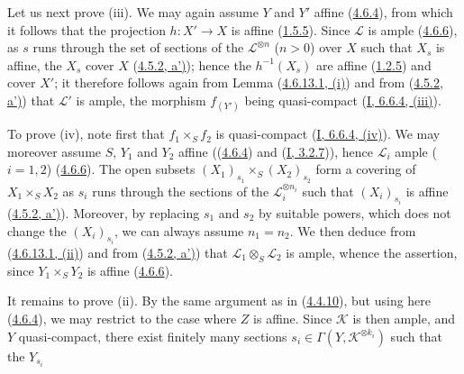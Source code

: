 Let us next prove (iii). We may again assume $Y$ and $Y'$ affine
(\hyperref[II.4.6.4]{4.6.4}), from which it follows that the projection
$h:X'\to X$ is affine (\hyperref[II.1.5.5]{1.5.5}). Since
$\mathcal{L}$ is ample (\hyperref[II.4.6.6]{4.6.6}), as $s$
runs through the set of sections of the $\mathcal{L}^{\otimes n}$ ($n>0$)
over $X$ such that $X_s$ is affine, the $X_s$ cover $X$
(\hyperref[II.4.5.2]{4.5.2, a')}); hence the $h^{-1}(X_s)$ are affine
(\hyperref[II.1.2.5]{1.2.5}) and cover $X'$; it therefore follows again
from Lemma (\hyperref[II.4.6.13.1]{4.6.13.1, (i)}) and from
(\hyperref[II.4.5.2]{4.5.2, a')}) that $\mathcal{L}'$ is ample, the
morphism $f_{(Y')}$ being quasi-compact
(\hyperref[I.6.6.4]{I, 6.6.4, (iii)}).

To prove (iv), note first that $f_1\times_S f_2$ is quasi-compact
(\hyperref[I.6.6.4]{I, 6.6.4, (iv)}). We may moreover assume $S$,
$Y_1$ and $Y_2$ affine ((\hyperref[II.4.6.4]{4.6.4}) and
(\hyperref[I.3.2.7]{I, 3.2.7})), hence $\mathcal{L}_i$ ample ($i=1,2$)
(\hyperref[II.4.6.6]{4.6.6}). The open subsets
$(X_1)_{s_1}\times_S(X_2)_{s_2}$ form a covering of
$X_1\times_S X_2$ as $s_i$ runs through the sections of the
$\mathcal{L}_i^{\otimes n_i}$ such that $(X_i)_{s_i}$ is affine
(\hyperref[II.4.5.2]{4.5.2, a')}). Moreover, by replacing $s_1$ and
$s_2$ by suitable powers, which does not change the
$(X_i)_{s_i}$, we can always assume $n_1=n_2$. We then deduce from
(\hyperref[II.4.6.13.1]{4.6.13.1, (ii)}) and from
(\hyperref[II.4.5.2]{4.5.2, a')}) that
$\mathcal{L}_1\otimes_S\mathcal{L}_2$ is ample, whence the assertion, since
$Y_1\times_S Y_2$ is affine (\hyperref[II.4.6.6]{4.6.6}).

It remains to prove (ii). By the same argument as in
(\hyperref[II.4.4.10]{4.4.10}), but using here
(\hyperref[II.4.6.4]{4.6.4}), we may restrict to the case where $Z$ is
affine. Since $\mathcal{K}$ is then ample, and $Y$ quasi-compact, there exist
finitely many sections $s_i\in\Gamma(Y,\mathcal{K}^{\otimes k_i})$
such that the $Y_{s_i}$


